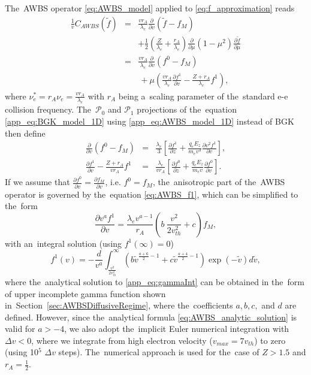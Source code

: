 \documentclass[
 aps,
 jmp,
 amsmath,amssymb,
 twocolumn,
]{revtex4-1}
\newcommand{\secref}[1]{Section~\ref{#1}}
\newcommand{\pdv}[2]{\frac{\partial{#1}}{\partial{#2}}}
\newcommand{\mfpe}{\lambda_e}
\newcommand{\Zbar}{Z}
\newcommand{\nue}{\nu_{e}}
\newcommand{\vmag}{v}
\newcommand{\vth}{v_{th}}
\newcommand{\Ez}{E_z}
\newcommand{\qe}{q_e}
\newcommand{\me}{m_e}
\newcommand{\fM}{f_M}
\newcommand{\ft}{f}
\begin{document}
The~AWBS operator \eqref{eq:AWBS_model} applied to 
\eqref{eq:f_approximation} reads
\begin{eqnarray}
  \frac{1}{\vmag}C_{AWBS}(\tilde{\ft})
  &=& 
  \frac{\vmag r_A}{\mfpe} \pdv{}{\vmag}\left(\tilde{\ft} - \fM\right) 
  \nonumber \\
  && + \frac{1}{2}\left(\frac{\Zbar}{\mfpe} + \frac{r_A}{\mfpe}\right)
  \pdv{}{\mu}(1 - \mu^2)\pdv{\tilde{\ft}}{\mu}  \nonumber \\
  &=& \frac{\vmag r_A}{\mfpe} \pdv{}{\vmag}\left(\ft^0 - \fM\right) \nonumber \\ 
  &&\, + \mu\left(\frac{\vmag r_A}{\mfpe} \pdv{\ft^1}{\vmag} 
  - \frac{\Zbar+r_A}{\mfpe}\ft^1\right) ,
  \label{app_eq:AWBS_model_1D}
\end{eqnarray}
where $\nue^* = r_A \nue = \frac{\vmag r_A}{\mfpe}$ with $r_A$ being a~scaling
parameter of the~standard e-e collision frequency. 
The~$\mathcal{P}_0$ and $\mathcal{P}_1$ projections 
of the~equation \eqref{app_eq:BGK_model_1D} using 
\eqref{app_eq:AWBS_model_1D} instead of BGK then define
\begin{eqnarray}
  \pdv{}{\vmag}\left( \ft^0 -\fM\right) &=& 
  \frac{\mfpe}{3}\left[\pdv{\ft^1}{z} +
  \frac{\qe\Ez}{\me\vmag^3}\pdv{\vmag^2\ft^1}{\vmag}\right] ,
  \label{app_eq:AWBS_f0} \\
  \pdv{\ft^1}{\vmag} 
  - \frac{\Zbar + r_A}{{\vmag r_A}}\ft^1 &=& \frac{\mfpe}{\vmag r_A}
  \left[\pdv{\ft^0}{z} + \frac{\qe\Ez}{\me\vmag}\pdv{\ft^0}{\vmag}\right] 
  .
  \label{app_eq:AWBS_f1} 
\end{eqnarray}
If we assume that $\pdv{\ft^0}{\vmag} = \pdv{\fM}{\vmag}$, i.e. $\ft^0 = \fM$,
the~anisotropic part of the~AWBS operator is governed by the~equation
\eqref{eq:AWBS_f1}, which can be simplified to the~form
\begin{equation}
  \pdv{\vmag^a \ft^1}{\vmag} = 
  \frac{\mfpe \vmag^{a-1}}{r_A}
  \left( b~\frac{\vmag^2}{2 \vth^2} + c\right)\fM ,
  \nonumber %
\end{equation}
with an~integral solution (using $\ft^1(\infty) = 0$)
\begin{equation}
  \ft^1(v) = - \frac{d}{\vmag^a} 
  \int_{\frac{\vmag^2}{2\vth^2}}^\infty (b \tilde{v}^{\frac{a+6}{2} - 1} 
  + c \tilde{v}^{\frac{a+4}{2} - 1}) \exp(-\tilde{v}) d\tilde{v} 
  ,
  \label{app_eq:gammaInt}
\end{equation}
where the~analytical solution to \eqref{app_eq:gammaInt} can be obtained 
in the~form of upper incomplete gamma function shown 
in~\secref{sec:AWBSDiffusiveRegime}, where the~coefficients 
$a, b, c,$ and $d$ are defined. 
However, since the~analytical formula \eqref{eq:AWBS_analytic_solution} 
is valid for $a>-4$, we also adopt the~implicit Euler 
numerical integration with $\Delta v < 0$, where we integrate from high 
electron velocity ($v_{max} = 7\vth$) to zero  
(using 10$^5$ $\Delta v$ steps). The~numerical approach is used for the~case
of $\Zbar > 1.5$ and $r_A = \frac{1}{2}$.
\end{document}
